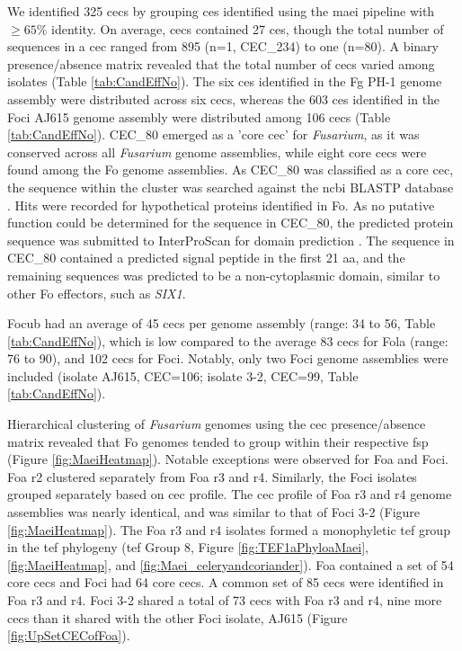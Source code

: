 We identified 325 \acfp{cec} by grouping \acp{ce} identified using the \ac{maei} pipeline with $\ge65\%$ identity. On average, \acp{cec} contained 27 \acp{ce}, though the total number of sequences in a \ac{cec} ranged from 895 (n=1, CEC\_234) to one (n=80). A binary presence/absence matrix revealed that the total number of \acp{cec} varied among isolates (Table \ref{tab:CandEffNo}). The six \acp{ce} identified in the \ac{Fg} PH-1 genome assembly were distributed across six \acp{cec}, whereas the 603 \acp{ce} identified in the \ac{Foci} AJ615 genome assembly were distributed among 106 \acp{cec} (Table \ref{tab:CandEffNo}). CEC\_80 emerged as a 'core \ac{cec}' for \textit{Fusarium}, as it was conserved across all \textit{Fusarium} genome assemblies, while eight core \acp{cec} were found among the \ac{Fo} genome assemblies. 
As CEC\_80 was classified as a core \ac{cec}, the sequence within the cluster was searched against the \ac{ncbi} BLASTP database \parencite{Nih2014}. Hits were recorded for hypothetical proteins identified in \ac{Fo}. As no putative function could be determined for the sequence in CEC\_80, the predicted protein sequence was submitted to InterProScan for domain prediction \parencite{jones2014interproscan}. The sequence in CEC\_80 contained a predicted signal peptide in the first 21 aa, and the remaining sequences was predicted to be a non-cytoplasmic domain, similar to other \ac{Fo} effectors, such as \textit{SIX1}. 

\ac{Focub} had an average of 45 \acp{cec} per genome assembly (range: 34 to 56, Table \ref{tab:CandEffNo}), which is low compared to the average 83 \acp{cec} for \ac{Fola} (range: 76 to 90), and 102 \acp{cec} for \ac{Foci}. Notably, only two \ac{Foci} genome assemblies were included (isolate AJ615, CEC=106; isolate 3-2, CEC=99, Table \ref{tab:CandEffNo}). 

Hierarchical clustering of \textit{Fusarium} genomes using the  \ac{cec} presence/absence matrix revealed that \ac{Fo} genomes tended to group within their respective \ac{fsp} (Figure \ref{fig:MaeiHeatmap}). Notable exceptions were observed for \ac{Foa} and \ac{Foci}. \ac{Foa} \ac{r2} clustered separately from \ac{Foa} \ac{r3} and \ac{r4}. Similarly, the \ac{Foci} isolates grouped separately based on \ac{cec} profile. The \ac{cec} profile of \ac{Foa} \ac{r3} and \ac{r4} genome assemblies was nearly identical, and was similar to that of \ac{Foci} 3-2 (Figure \ref{fig:MaeiHeatmap}). The \ac{Foa} \ac{r3} and \ac{r4} isolates formed a monophyletic \ac{tef} group in the \ac{tef} phylogeny (\ac{tef} Group 8, Figure \ref{fig:TEF1aPhyloaMaei}, \ref{fig:MaeiHeatmap}, and \ref{fig:Maei_celeryandcoriander}). \ac{Foa} contained a set of 54 core \acp{cec} and \ac{Foci} had 64 core \acp{cec}. A common set of 85 \acp{cec} were identified in \ac{Foa} \ac{r3} and \ac{r4}. \ac{Foci} 3-2 shared a total of 73 \acp{cec} with \ac{Foa} \ac{r3} and \ac{r4}, nine more \acp{cec} than it shared with the other \ac{Foci} isolate, AJ615 (Figure \ref{fig:UpSetCECofFoa}). 

